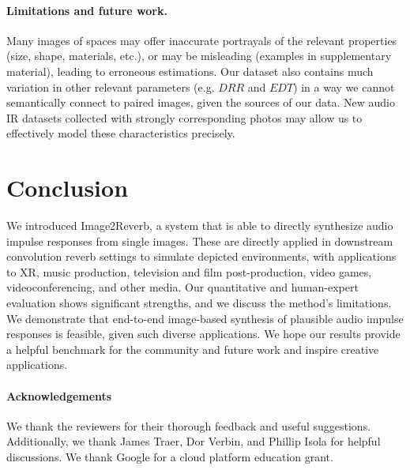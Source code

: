 \documentclass[10pt,twocolumn,letterpaper]{article}
\begin{document}
\paragraph{Limitations and future work.}
Many images of spaces may offer inaccurate portrayals of the relevant properties (size, shape, materials, etc.), or may be misleading (examples in supplementary material), leading to erroneous estimations. Our dataset also contains much variation in other relevant parameters (e.g. $DRR$ and $EDT$) in a way we cannot semantically connect to paired images, given the sources of our data. New audio IR datasets collected with strongly corresponding photos may allow us to effectively model these characteristics precisely.

\section{Conclusion}
We introduced Image2Reverb, a system that is able to directly synthesize audio impulse responses from single images. These are directly applied in downstream convolution reverb settings to simulate depicted environments, with applications to XR, music production, television and film post-production, video games, videoconferencing, and other media. Our quantitative and human-expert evaluation shows significant strengths, and we discuss the method's limitations. We demonstrate that end-to-end image-based synthesis of plausible audio impulse responses is feasible, given such diverse applications. We hope our results provide a helpful benchmark for the community and future work and inspire creative applications.

{\small
\paragraph{Acknowledgements}
We thank the reviewers for their thorough feedback and useful suggestions. Additionally, we thank James Traer, Dor Verbin, and Phillip Isola for helpful discussions. We thank Google for a cloud platform education grant.
}

{\small


}
\end{document}
